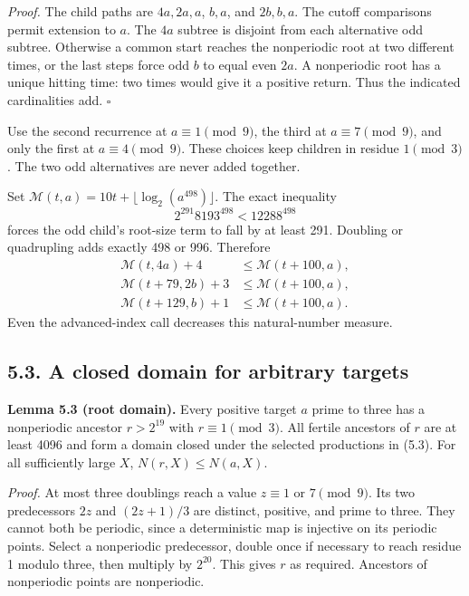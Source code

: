 \documentclass[11pt,a4paper]{article}
\begin{document}
\emph{Proof.} The child paths are \(4a,2a,a\), \(b,a\), and \(2b,b,a\).
The cutoff comparisons permit extension to \(a\). The \(4a\) subtree is
disjoint from each alternative odd subtree. Otherwise a common start
reaches the nonperiodic root at two different times, or the last steps
force odd \(b\) to equal even \(2a\). A nonperiodic root has a unique
hitting time: two times would give it a positive return. Thus the
indicated cardinalities add. \(\square\)

Use the second recurrence at \(a\equiv1\pmod9\), the third at
\(a\equiv7\pmod9\), and only the first at \(a\equiv4\pmod9\). These
choices keep children in residue \(1\pmod3\). The two odd alternatives
are never added together.

Set \(\mathcal M(t,a)=10t+\lfloor\log_2(a^{498})\rfloor\). The exact
inequality \[
2^{291}8193^{498}<12288^{498}
\tag{5.4}
\] forces the odd child's root-size term to fall by at least 291.
Doubling or quadrupling adds exactly 498 or 996. Therefore \[
\begin{aligned}
\mathcal M(t,4a)+4&\le\mathcal M(t+100,a),\\
\mathcal M(t+79,2b)+3&\le\mathcal M(t+100,a),\\
\mathcal M(t+129,b)+1&\le\mathcal M(t+100,a).
\end{aligned}
\tag{5.5}
\] Even the advanced-index call decreases this natural-number measure.

\subsection{5.3. A closed domain for arbitrary
targets}\label{a-closed-domain-for-arbitrary-targets}

\textbf{Lemma 5.3 (root domain).} Every positive target \(a\) prime to
three has a nonperiodic ancestor \(r>2^{19}\) with \(r\equiv1\pmod3\).
All fertile ancestors of \(r\) are at least 4096 and form a domain
closed under the selected productions in (5.3). For all sufficiently
large \(X\), \(N(r,X)\le N(a,X)\).

\emph{Proof.} At most three doublings reach a value \(z\equiv1\) or
\(7\pmod9\). Its two predecessors \(2z\) and \((2z+1)/3\) are distinct,
positive, and prime to three. They cannot both be periodic, since a
deterministic map is injective on its periodic points. Select a
nonperiodic predecessor, double once if necessary to reach residue 1
modulo three, then multiply by \(2^{20}\). This gives \(r\) as required.
Ancestors of nonperiodic points are nonperiodic.
\end{document}
